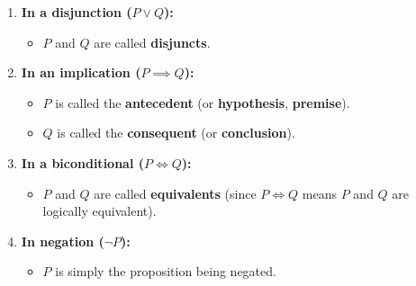 \documentclass{report}
\begin{document}
\begin{itemize}
\begin{enumerate}
                \item \textbf{In a disjunction (\( P \lor Q \)):}
                    \begin{itemize}
                        \item \( P \) and \( Q \) are called \textbf{disjuncts}.
                    \end{itemize}
                \item \textbf{In an implication (\( P \implies Q \)):}
                    \begin{itemize}
                        \item \( P \) is called the \textbf{antecedent} (or \textbf{hypothesis}, \textbf{premise}).
                        \item \( Q \) is called the \textbf{consequent} (or \textbf{conclusion}).
                    \end{itemize}
                \item \textbf{In a biconditional (\( P \iff Q \)):}
                    \begin{itemize}
                        \item \( P \) and \( Q \) are called \textbf{equivalents} (since \( P \iff Q \) means \( P \) and \( Q \) are logically equivalent).
                    \end{itemize}
                \item \textbf{In negation (\( \neg P \)):}
                    \begin{itemize}
                        \item \( P \) is simply the proposition being negated.
                    \end{itemize}
            \end{enumerate}


\end{itemize}
\end{document}
